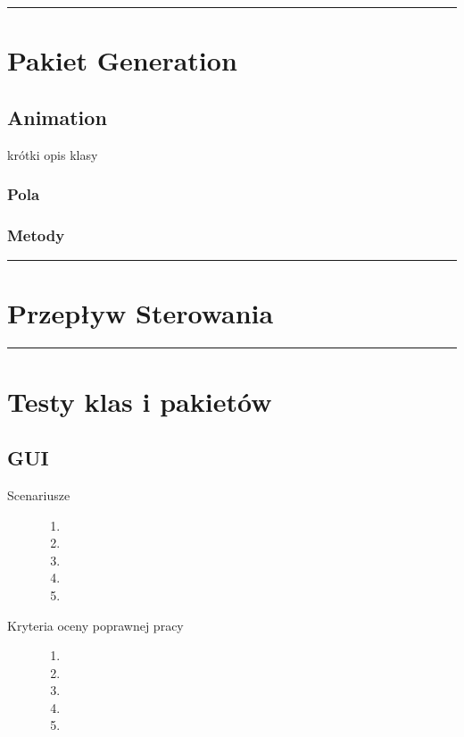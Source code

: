 \documentclass[a4paper,11pt]{article}
\newcommand{\linia}{\rule{\linewidth}{0.4mm}}
\begin{document}
\noindent\linia

\section{Pakiet Generation}

\subsection{Animation}
krótki opis klasy
\subsubsection{Pola}

\subsubsection{Metody}

\noindent\linia
\section{Przepływ Sterowania}




\noindent\linia
\section{Testy klas i pakietów}


\subsection{GUI}
\begin{description}

\item[Scenariusze] \hfill
\begin{enumerate}
\item
\item 
\item
\item
\item 
\end{enumerate}

\item[Kryteria oceny poprawnej pracy] \hfill
\begin{enumerate}
\item 
\item
\item
\item 
\item 
\end{enumerate}

\end{description}
\end{document}
